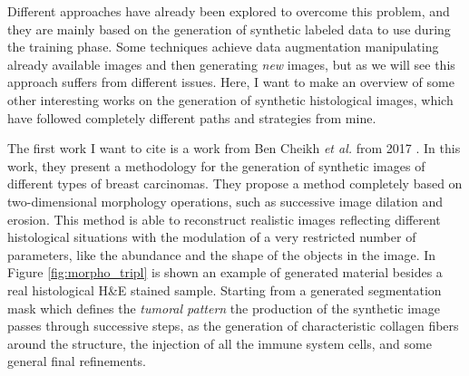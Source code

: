 Different approaches have already been explored to overcome this problem, and they are mainly based on the generation of synthetic labeled data to use during the training phase. Some techniques achieve data augmentation manipulating already available images and then generating \textit{new} images, but as we will see this approach suffers from different issues. Here, I want to make an overview of some other interesting works on the generation of synthetic histological images, which have followed completely different paths and strategies from mine.

The first work I want to cite is a work from Ben Cheikh \textit{et al.} from 2017 \cite{10.1117/12.2254452}. In this work, they present a methodology for the generation of synthetic images of different types of breast carcinomas. They propose a method completely based on two-dimensional morphology operations, such as successive image dilation and erosion. This method is able to reconstruct realistic images reflecting different histological situations with the modulation of a very restricted number of parameters, like the abundance and the shape of the objects in the image. In Figure \ref{fig:morpho_tripl} is shown an example of generated material besides a real histological H\&E stained sample. Starting from a generated segmentation mask which defines the \textit{tumoral pattern} the production of the synthetic image passes through successive steps, as the generation of characteristic collagen fibers around the structure, the injection of all the immune system cells, and some general
final refinements.

